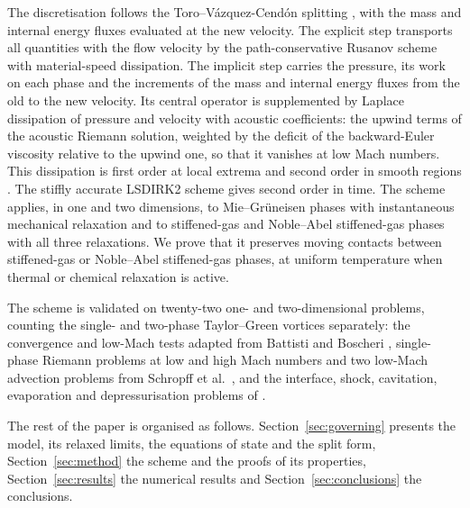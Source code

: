 \documentclass[a4paper,fleqn]{cas-sc}
\begin{document}
The discretisation follows the Toro--V\'azquez-Cend\'on splitting \cite{ToroVazquez2012}, with the mass and internal energy
fluxes evaluated at the new velocity. The explicit step transports all quantities with the flow velocity by the
path-conservative Rusanov scheme \cite{Pares2006,Castro2006} with material-speed dissipation. The implicit step carries
the pressure, its work on each phase and the increments of the mass and internal energy fluxes from the old to the new
velocity. Its central operator is supplemented by Laplace dissipation of pressure and
velocity with acoustic coefficients: the upwind terms of the acoustic Riemann solution, weighted by the deficit of the
backward-Euler viscosity relative to the upwind one, so that it vanishes at low Mach numbers. This dissipation is first
order at local extrema and second order in smooth regions \cite{Jameson1995}. The stiffly accurate LSDIRK2 scheme
\cite{BoscarinoFilbetRusso2016} gives second order in time. The scheme applies, in one and two dimensions, to
Mie--Gr\"uneisen phases with instantaneous mechanical relaxation and to stiffened-gas and Noble--Abel stiffened-gas
phases with all three relaxations. We prove that it preserves moving contacts between stiffened-gas or Noble--Abel
stiff\-ened-gas phases, at uniform temperature when thermal or chemical relaxation is active.

The scheme is validated on twenty-two one- and two-dimensional problems, counting the single- and two-phase
Taylor--Green vortices separately: the convergence and low-Mach tests adapted from Battisti and Boscheri
\cite{BattistiBoscheri2025}, single-phase Riemann problems at low and high Mach numbers and two low-Mach advection
problems from Schropff et al.\ \cite{Schropff2026}, and the interface, shock, cavitation, evaporation and
depressurisation problems of \cite{SPB2009,PelantiShyue2014,Pelanti2022}.

The rest of the paper is organised as follows. Section~\ref{sec:governing} presents the model, its relaxed limits, the
equations of state and the split form, Section~\ref{sec:method} the scheme and the proofs of its properties,
Section~\ref{sec:results} the numerical results and Section~\ref{sec:conclusions} the conclusions.


\end{document}
